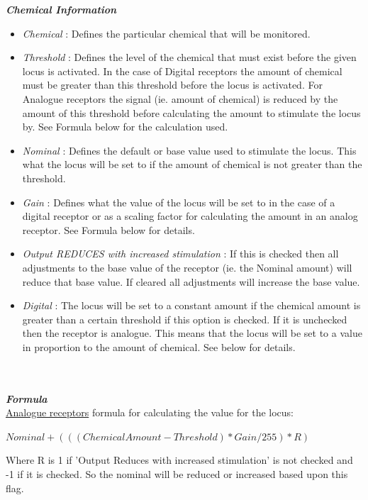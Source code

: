 \documentclass[11pt,twoside,a4paper]{article}
\begin{document}
\textbf{\textit{Chemical Information}}
\begin{itemize}
	\item[] \emph{Chemical} : Defines the particular chemical that will be monitored. %
	\item[] \emph{Threshold} : Defines the level of the chemical that must exist before the given locus is activated. In the case of Digital receptors the amount of chemical must be greater than this threshold before the locus is activated. For Analogue receptors the signal (ie. amount of chemical) is reduced by the amount of this threshold before calculating the amount to stimulate the locus by. See Formula below for the calculation used.
	\item[] \emph{Nominal} : Defines the default or base value used to stimulate the locus. This what the locus will be set to if the amount of chemical is not greater than the threshold. 
	\item[] \emph{Gain} : Defines what the value of the locus will be set to in the case of a digital receptor or as a scaling factor for calculating the amount in an analog receptor. See Formula below for details.
	\item[] \emph{Output REDUCES with increased stimulation} : If this is checked then all adjustments to the base value of the receptor (ie. the Nominal amount) will reduce that base value. If cleared all adjustments will increase the base value.
	\item[] \emph{Digital} : The locus will be set to a constant amount if the chemical amount is greater than a certain threshold if this option is checked. If it is unchecked then the receptor is analogue. This means that the locus will be set to a value in proportion to the amount of chemical. See below for details.
\end{itemize}~\\~\\

\textbf{\textit{Formula}}~\\

\underline{Analogue receptors} formula for calculating the value for the locus:

$Nominal + (((ChemicalAmount - Threshold) * Gain/255) * R)$

Where R is 1 if 'Output Reduces with increased stimulation' is not checked and -1 if it is checked. So the nominal will be reduced or increased based upon this flag.~\\
\end{document}
